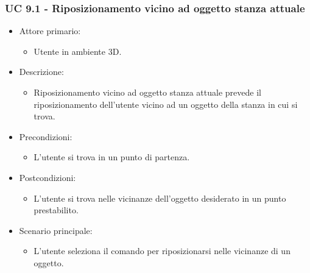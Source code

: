 \subsubsection{UC 9.1 - Riposizionamento vicino ad oggetto stanza attuale}
\begin{itemize}

	\item Attore primario: 
	\begin{itemize}
		\item Utente in ambiente 3D.
	\end{itemize}
	\item Descrizione:
	\begin{itemize}
		\item Riposizionamento vicino ad oggetto stanza attuale prevede il riposizionamento dell'utente vicino ad un oggetto
della stanza in cui si trova.
	\end{itemize}
	
	\item Precondizioni:
	\begin{itemize}
		\item L'utente si trova in un punto di partenza.
	\end{itemize}
	
	\item Postcondizioni:
	\begin{itemize}
		\item L'utente si trova nelle vicinanze dell'oggetto desiderato in un punto prestabilito.
	\end{itemize}
	
	\item Scenario principale:
	\begin{itemize}
		\item L'utente seleziona il comando per riposizionarsi nelle vicinanze di un oggetto.
	\end{itemize}
	
\end{itemize}

